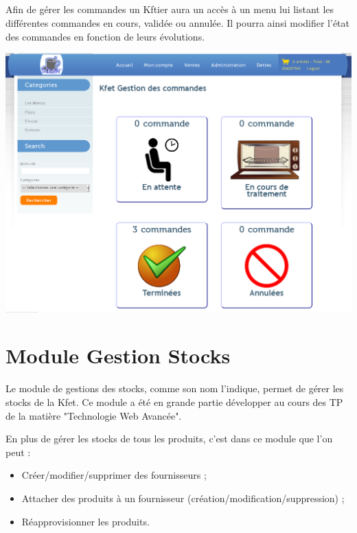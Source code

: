 \documentclass[twoside,UTF8]{EPURapport}
\begin{document}
        \paragraph{}Afin de gérer les commandes un Kftier aura un accès à un menu lui listant les différentes commandes en cours, validée ou annulée. Il pourra ainsi modifier l'état des commandes en fonction de leurs évolutions.

        \begin{center}
            \includegraphics[width=0.8\linewidth]{logos/gestionCommande.png}
        \end{center}


\chapter{Module Gestion Stocks}
\label{stock}

Le module de gestions des stocks, comme son nom l'indique, permet de gérer les stocks de la Kfet. Ce module a été en grande partie développer au cours des TP de la matière "Technologie Web Avancée".

En plus de gérer les stocks de tous les produits, c'est dans ce module que l'on peut :
\begin{itemize}
    \item Créer/modifier/supprimer des fournisseurs ;
    \item Attacher des produits à un fournisseur (création/modification/suppression) ;
    \item Réapprovisionner les produits.
\end{itemize}
\end{document}

